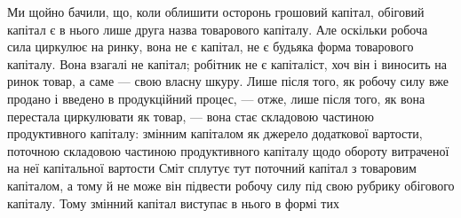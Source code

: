 Ми щойно бачили, що, коли облишити осторонь грошовий капітал,
обіговий капітал є в нього лише друга назва товарового капіталу. Але
оскільки робоча сила циркулює на ринку, вона не є капітал, не є будьяка
форма товарового капіталу. Вона взагалі не капітал; робітник не є
капіталіст, хоч він і виносить на ринок товар, а саме — свою власну шкуру.
Лише після того, як робочу силу вже продано і введено в продукційний
процес, — отже, лише після того, як вона перестала циркулювати
як товар, — вона стає складовою частиною продуктивного капіталу: змінним
капіталом як джерело додаткової вартости, поточною складовою
частиною продуктивного капіталу щодо обороту витраченої на неї капітальної
вартости Сміт сплутує тут поточний капітал з товаровим капіталом,
а тому й не може він підвести робочу силу під свою рубрику обігового
капіталу. Тому змінний капітал виступає в нього в формі тих
\parbreak{}  %
